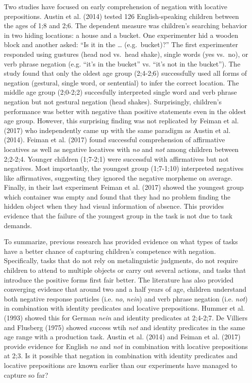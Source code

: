 \documentclass[man,floatsintext]{apa6}
\begin{document}
Two studies have focused on early comprehension of negation with locative prepositions. Austin et al. (2014) tested 126 English-speaking children between the ages of 1;8 and 2;6. The dependent measure was children's searching behavior in two hiding locations: a house and a bucket. One experimenter hid a wooden block and another asked: \enquote{Is it in the \ldots{} (e.g.~bucket)?} The first experimenter responded using gustures (head nod vs.~head shake), single words (yes vs.~no), or verb phrase negation (e.g. \enquote{it's in the bucket} vs. \enquote{it's not in the bucket}). The study found that only the oldest age group (2;4-2;6) successfully used all forms of negation (gestural, single word, or sentential) to infer the correct location. The middle age group (2;0-2;2) succesfully interpreted single word and verb phrase negation but not gestural negation (head shakes). Surprisingly, children's performance was better with negative than positive statements even in the oldest age group. However, this surprising finding was not replicated by Feiman et al. (2017) who independently came up with the same paradigm as Austin et al. (2014). Feiman et al. (2017) found successful comprehension of affirmative locatives as well as negative locatives with \emph{no} and \emph{not} among children between 2;2-2;4. Younger children (1;7-2;1) were successful with affirmatives but not negatives. Most importantly, the youngest group (1;7-1;10) interpreted negatives like affirmatives, suggesting they ignored the negative morpheme on average. Finally, in their last experiment Feiman et al. (2017) showed the youngest group which container was empty and found that they had no problem finding the hidden object when they had visual information of absence. This provides evidence that the failure of the youngest group in the task is not due to task demands.

To summarize, previous research has provided evidence on what types of tasks have a better chance of capturing children's competence with negation. Specifically, tasks that do not rely on metalinguistic judgments, do not require children to attend to multiple objects or carry out several actions, and tasks that introduce the positive forms first fair better. The literature has also provided converging evidence that around two and a half years of age, children understand both negative response particles (i.e. \emph{no}, \emph{nein}) and verb phrase negation (i.e. \emph{not}) in combination with identity predicates and locative prepositions. Hummer et al. (1993) showed this for German \emph{nein} and identity predicates at 2;4-2;7. De Villiers and Flusberg (1975) showed success wtih \emph{not} and identity predicates in the same age range with a production task. Austin et al. (2014) and Feiman et al. (2017) provide evidence for English \emph{no} and \emph{not} in combination with locative prepositions at 2;3. Is it possible that negation in combination with identity predicates and locative prepositions are known earlier than our experiments have managed to capture so far?
\end{document}
